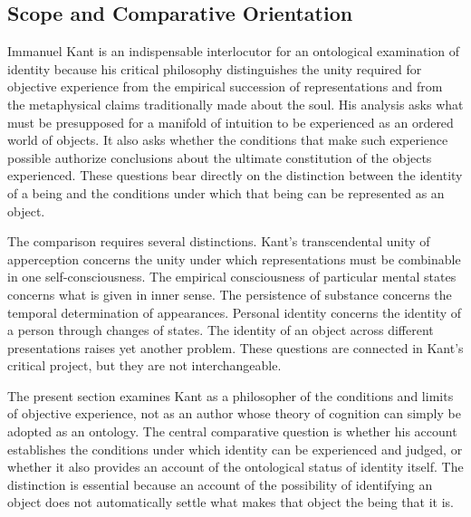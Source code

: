 
\subsection*{Scope and Comparative Orientation}

\label{para:VS.B01.P01.C08.S10.SS01.P001}

Immanuel Kant is an indispensable interlocutor for an
ontological examination of identity because his critical
philosophy distinguishes the unity required for objective
experience from the empirical succession of representations
and from the metaphysical claims traditionally made about
the soul. His analysis asks what must be presupposed for
a manifold of intuition to be experienced as an ordered
world of objects. It also asks whether the conditions
that make such experience possible authorize conclusions
about the ultimate constitution of the objects experienced.
These questions bear directly on the distinction between
the identity of a being and the conditions under which
that being can be represented as an object.

\label{para:VS.B01.P01.C08.S10.SS01.P002}

The comparison requires several distinctions. Kant's
transcendental unity of apperception concerns the unity
under which representations must be combinable in one
self-consciousness. The empirical consciousness of
particular mental states concerns what is given in inner
sense. The persistence of substance concerns the temporal
determination of appearances. Personal identity concerns
the identity of a person through changes of states.
The identity of an object across different presentations
raises yet another problem. These questions are connected
in Kant's critical project, but they are not interchangeable.

\label{para:VS.B01.P01.C08.S10.SS01.P003}

The present section examines Kant as a philosopher of the
conditions and limits of objective experience, not as an
author whose theory of cognition can simply be adopted
as an ontology. The central comparative question is whether
his account establishes the conditions under which identity
can be experienced and judged, or whether it also provides
an account of the ontological status of identity itself.
The distinction is essential because an account of the
possibility of identifying an object does not automatically
settle what makes that object the being that it is.

